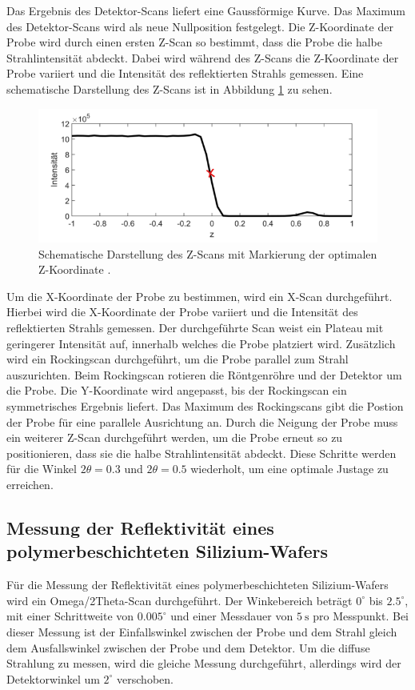 Das Ergebnis des Detektor-Scans liefert eine Gaussförmige Kurve.
Das Maximum des Detektor-Scans wird als neue Nullposition festgelegt.
Die Z-Koordinate der Probe wird durch einen ersten Z-Scan so bestimmt, dass die Probe die halbe Strahlintensität abdeckt.
Dabei wird während des Z-Scans die Z-Koordinate der Probe variiert und die Intensität des reflektierten Strahls gemessen.
Eine schematische Darstellung des Z-Scans ist in Abbildung \ref{fig:zscan} zu sehen.
\begin{figure}[H]
    \centering
    \includegraphics[width=\textwidth]{Bilder/zscan.png}
    \caption{Schematische Darstellung des Z-Scans mit Markierung der optimalen Z-Koordinate \cite{sample}.}
    \label{fig:zscan}
\end{figure}
Um die X-Koordinate der Probe zu bestimmen, wird ein X-Scan durchgeführt.
Hierbei wird die X-Koordinate der Probe variiert und die Intensität des reflektierten Strahls gemessen.
Der durchgeführte Scan weist ein Plateau mit geringerer Intensität auf, innerhalb welches die Probe platziert wird.
Zusätzlich wird ein Rockingscan durchgeführt, um die Probe parallel zum Strahl auszurichten.
Beim Rockingscan rotieren die Röntgenröhre und der Detektor um die Probe.
Die Y-Koordinate wird angepasst, bis der Rockingscan ein symmetrisches Ergebnis liefert.
Das Maximum des Rockingscans gibt die Postion der Probe für eine parallele Ausrichtung an.
Durch die Neigung der Probe muss ein weiterer Z-Scan durchgeführt werden, um die Probe erneut so zu positionieren, dass sie die halbe Strahlintensität abdeckt.
Diese Schritte werden für die Winkel $2 \theta = 0.3$ und $2 \theta = 0.5$ wiederholt, um eine optimale Justage zu erreichen.

\subsection{Messung der Reflektivität eines polymerbeschichteten Silizium-Wafers}
\label{subsec:Messung}
Für die Messung der Reflektivität eines polymerbeschichteten Silizium-Wafers wird ein Omega/2Theta-Scan durchgeführt.
Der Winkebereich beträgt $0^\circ$ bis $2.5^\circ$, mit einer Schrittweite von $0.005^\circ$ und einer Messdauer von $\SI{5}{\second}$ pro Messpunkt.
Bei dieser Messung ist der Einfallswinkel zwischen der Probe und dem Strahl gleich dem Ausfallswinkel zwischen der Probe und dem Detektor.
Um die diffuse Strahlung zu messen, wird die gleiche Messung durchgeführt, allerdings wird der Detektorwinkel um $2^\circ$ verschoben.